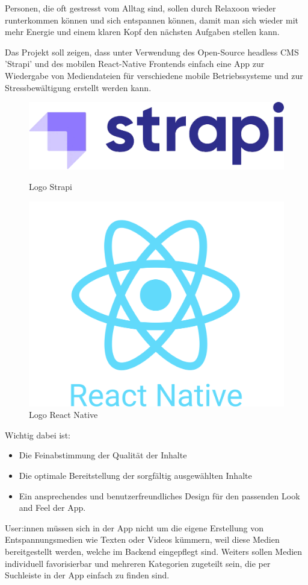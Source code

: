 
Personen, die oft gestresst vom Alltag sind, sollen durch Relaxoon wieder runterkommen können
und sich entspannen können, damit man sich wieder mit mehr Energie und einem klaren Kopf den
nächsten Aufgaben stellen kann.

Das Projekt soll zeigen, dass unter Verwendung des Open-Source headless CMS 'Strapi' und des mobilen
React-Native Frontends einfach eine App zur Wiedergabe von Mediendateien für verschiedene mobile Betriebssysteme
und zur Stressbewältigung erstellt werden kann. 


\begin{figure}[H]
    \begin{minipage}{0.5\textwidth}
        \centering
        \includegraphics[height=0.2\textwidth]{./pics/strapi-logo.png}
        \caption{Logo Strapi}
    \end{minipage}
    \begin{minipage}{0.5\textwidth}
        \centering
        \includegraphics[height=0.6\textwidth]{./pics/react-native-logo.png}
        \caption{Logo React Native}
    \end{minipage}
\end{figure}

Wichtig dabei ist: 

\begin{itemize}
    \item Die Feinabstimmung der Qualität der Inhalte
    \item Die optimale Bereitstellung der sorgfältig ausgewählten Inhalte
    \item Ein ansprechendes und benutzerfreundliches Design für den passenden Look and Feel der App.
\end{itemize}

User:innen müssen sich in der App nicht um die eigene Erstellung von Entspannungsmedien wie Texten oder Videos
kümmern, weil diese Medien bereitgestellt werden, welche im Backend eingepflegt sind. Weiters sollen Medien
individuell favorisierbar und mehreren Kategorien zugeteilt sein, die per Suchleiste in der App einfach zu
finden sind.

